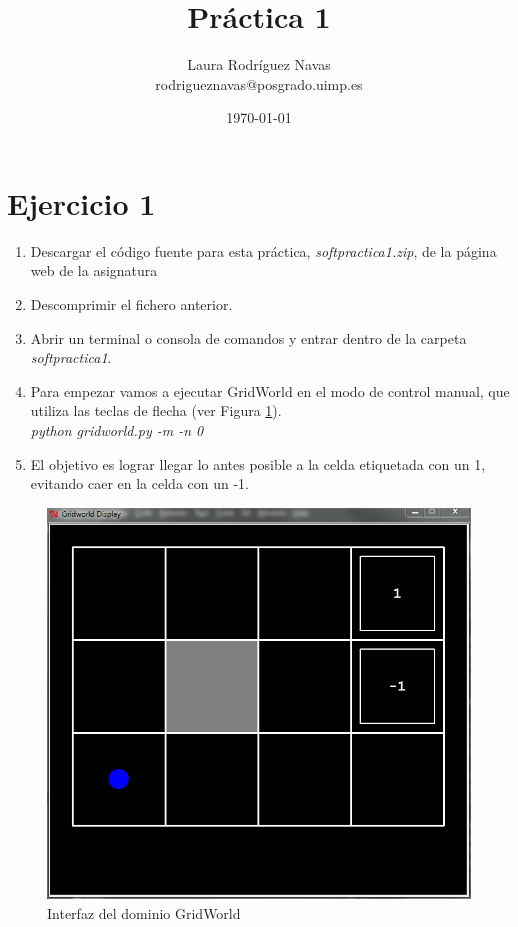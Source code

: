 \documentclass[11pt]{exam}
\title{Práctica 1}
\author{Laura Rodríguez Navas \\ rodrigueznavas@posgrado.uimp.es}
\date{{\selectlanguage{spanish}\today} }
\begin{document}
	
\maketitle

\section*{Ejercicio 1}

\begin{enumerate}
	\item Descargar el código fuente para esta práctica, \textit{softpractica1.zip}, de la página web de la asignatura
	\item Descomprimir el fichero anterior.
	\item Abrir un terminal o consola de comandos y entrar dentro de la carpeta \textit{softpractica1}.
	\item Para empezar vamos a ejecutar GridWorld en el modo de control manual, que utiliza las teclas de flecha (ver Figura \ref{image_1}). \\ \textit{python gridworld.py -m -n 0}	
	\item El objetivo es lograr llegar lo antes posible a la celda etiquetada con un 1, evitando caer en la celda con un -1.
\end{enumerate}

\begin{figure}[h]
	\centering
	\includegraphics[scale=0.5]{image_1}
	\caption{Interfaz del dominio GridWorld}
	\label{image_1}
\end{figure}
\end{document}
